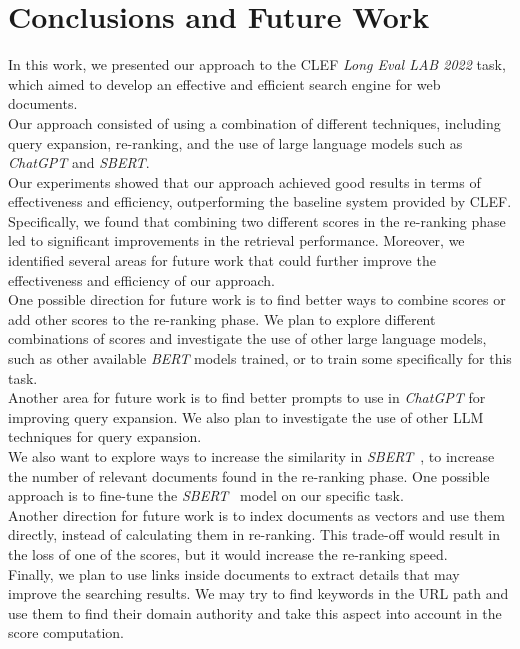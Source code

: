 \newpage
\section{Conclusions and Future Work}
\label{sec:conclusion}
 
In this work, we presented our approach to the \ac{CLEF} \textit{Long Eval LAB 2022} task, which aimed to develop an effective and efficient search engine for web documents. \\
Our approach consisted of using a combination of different techniques, including query expansion, re-ranking, and the use of large language models such as \textit{ChatGPT} and \textit{SBERT}. \\
Our experiments showed that our approach achieved good results in terms of effectiveness and efficiency, outperforming the baseline system provided by \ac{CLEF}. Specifically, we found that combining two different scores in the re-ranking phase led to significant improvements in the retrieval performance. Moreover, we identified several areas for future work that could further improve the effectiveness and efficiency of our approach. \\
One possible direction for future work is to find better ways to combine scores or add other scores to the re-ranking phase. We plan to explore different combinations of scores and investigate the use of other large language models, such as other available \textit{BERT} models trained, or to train some specifically for this task. \\
Another area for future work is to find better prompts \cite{wang2023chatgpt} to use in \textit{ChatGPT} for improving query expansion. We also plan to investigate the use of other \ac{LLM} techniques for query expansion. \\
We also want to explore ways to increase the similarity in \textit{SBERT}~\cite{reimers-2019-sentence-bert}, to increase the number of relevant documents found in the re-ranking phase. One possible approach is to fine-tune the \textit{SBERT}~\cite{reimers-2019-sentence-bert} model on our specific task. \\
Another direction for future work is to index documents as vectors and use them directly, instead of calculating them in re-ranking. This trade-off would result in the loss of one of the scores, but it would increase the re-ranking speed. \\
Finally, we plan to use links inside documents to extract details that may improve the searching results. We may try to find keywords in the URL path and use them to find their domain authority and take this aspect into account in the score computation.
